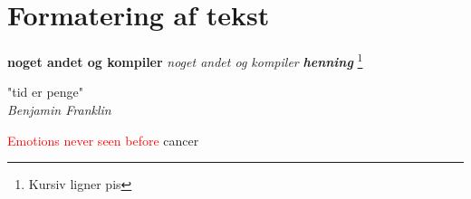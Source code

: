 \chapter{Formatering af tekst}
\textbf{noget andet og kompiler} \newline
\textit{noget andet og kompiler} \newline
\textbf{\textit{henning}}
\footnote{Kursiv ligner pis}
\begin{flushright}
"tid er penge"\\
\textit{Benjamin Franklin}
\end{flushright}
\textcolor{red}{Emotions never seen before}
\textcolor{cancer}{cancer}